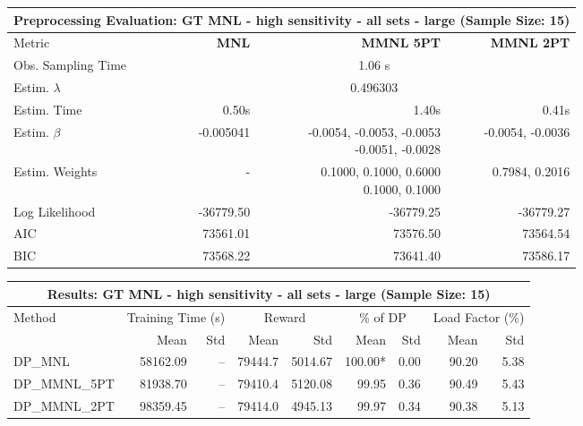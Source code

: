 
\begin{samepage}
\begin{center}
  \small
  \begin{tabular}{l|r|r|r}
    \toprule
    \multicolumn{4}{c}{\textbf{Preprocessing Evaluation: GT MNL - high sensitivity - all sets - large (Sample Size: 15)}} \\
    \midrule
    Metric & \textbf{MNL} & \textbf{MMNL 5PT} & \textbf{MMNL 2PT} \\
    \midrule
    Obs. Sampling Time & \multicolumn{3}{c}{1.06 s} \\
    Estim. $\lambda$ & \multicolumn{3}{c}{0.496303} \\
    Estim. Time & 0.50s & 1.40s & 0.41s \\
    Estim. $\beta$ & -0.005041 & \makecell[tr]{-0.0054, -0.0053, -0.0053 \\ -0.0051, -0.0028} & -0.0054, -0.0036 \\
    Estim. Weights & - & \makecell[tr]{0.1000, 0.1000, 0.6000 \\ 0.1000, 0.1000} & 0.7984, 0.2016 \\
    Log Likelihood & -36779.50 & -36779.25 & -36779.27 \\
    AIC & 73561.01 & 73576.50 & 73564.54 \\
    BIC & 73568.22 & 73641.40 & 73586.17 \\
    \bottomrule
  \end{tabular}
\end{center}
\begin{center}
  \small
  \begin{tabular}{l|rr|rr|rr|rr}
    \toprule
    \multicolumn{9}{c}{\textbf{Results: GT MNL - high sensitivity - all sets - large (Sample Size: 15)}} \\
    \midrule
    Method & \multicolumn{2}{c|}{Training Time (s)} & \multicolumn{2}{c|}{Reward} & \multicolumn{2}{c|}{\% of DP} & \multicolumn{2}{c}{Load Factor (\%)} \\
    & Mean & Std & Mean & Std & Mean & Std & Mean & Std \\
    \midrule
    DP\_MNL      & 58162.09 &    -- &    79444.7 &    5014.67 & 100.00* &    0.00 &   90.20 &    5.38 \\
    DP\_MMNL\_5PT & 81938.70 &    -- &    79410.4 &    5120.08 &   99.95 &    0.36 &   90.49 &    5.43 \\
    DP\_MMNL\_2PT & 98359.45 &    -- &    79414.0 &    4945.13 &   99.97 &    0.34 &   90.38 &    5.13 \\
    \midrule

\end{tabular}
\end{center}
\end{samepage}
